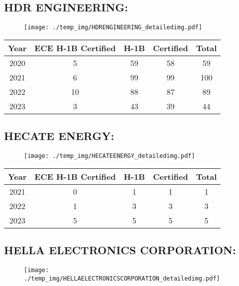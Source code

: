 \documentclass{article}%
\begin{document}
%
\newpage%
\subsection{HDR ENGINEERING:}%
\label{subsec:HDRENGINEERING}%
\label{HDRENGINEERINGdetailed}%


\begin{figure}[htbp]%
\centering%
\texttt{[image: ./temp\_img/HDRENGINEERING\_detailedimg.pdf]}%
\end{figure}

%
\begin{longtable}{c|c|c|c|c}%
\hline%
Year&ECE H{-}1B Certified&H{-}1B&Certified&Total\\%
\hline%
2020&5&59&58&59\\%
\hline%
2021&6&99&99&100\\%
\hline%
2022&10&88&87&89\\%
\hline%
2023&3&43&39&44\\%
\hline%
\end{longtable}

%
\newpage%
\subsection{HECATE ENERGY:}%
\label{subsec:HECATEENERGY}%
\label{HECATEENERGYdetailed}%


\begin{figure}[htbp]%
\centering%
\texttt{[image: ./temp\_img/HECATEENERGY\_detailedimg.pdf]}%
\end{figure}

%
\begin{longtable}{c|c|c|c|c}%
\hline%
Year&ECE H{-}1B Certified&H{-}1B&Certified&Total\\%
\hline%
2021&0&1&1&1\\%
\hline%
2022&1&3&3&3\\%
\hline%
2023&5&5&5&5\\%
\hline%
\end{longtable}

%
\newpage%
\subsection{HELLA ELECTRONICS CORPORATION:}%
\label{subsec:HELLAELECTRONICSCORPORATION}%
\label{HELLAELECTRONICSCORPORATIONdetailed}%


\begin{figure}[htbp]%
\centering%
\texttt{[image: ./temp\_img/HELLAELECTRONICSCORPORATION\_detailedimg.pdf]}%
\end{figure}
\end{document}
